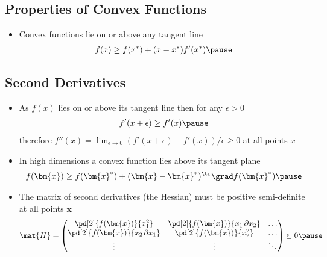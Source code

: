 
\begin{slide}
\section[-2]{Properties of Convex Functions}

\pb
\begin{itemize}
\item Convex functions lie on or above any tangent line
  \begin{align*}
    f(x) \geq f(x^*) + (x-x^*) f'(x^*)\pause
  \end{align*}
  \begin{center}
    \pauseb
  \end{center}
\end{itemize}

\end{slide}


\begin{slide}
\section[-2]{Second Derivatives}

\begin{PauseHighLight}
  \begin{itemize}
  \item As $f(x)$ lies on or above its tangent line then for any $\epsilon>0$
    \begin{align*}
      f'(x+\epsilon)\geq f'(x)\pause
    \end{align*}
    therefore $f''(x) = \lim_{\epsilon\rightarrow0} (f'(x+\epsilon)-
    f'(x))/\epsilon \geq 0$ at all points $x$\pause
  \item In high dimensions a convex function lies above its tangent plane
    \begin{align*}
      f(\bm{x}) \geq f(\bm{x}^*) + (\bm{x}-\bm{x}^*)^\tr \grad f(\bm{x}^*)\pause
    \end{align*}
  \item The matrix of second derivatives (the Hessian) must be
    positive semi-definite at all points $\bm{x}$
    {\small \begin{align*}
      \mat{H} =
      \begin{pmatrix}
        \pd[2]{f(\bm{x})}{x_1^2} & \pd[2]{f(\bm{x})}{x_1\, \partial
          x_2} & \ldots \\
        \pd[2]{f(\bm{x})}{x_2 \, \partial x_1} &
        \pd[2]{f(\bm{x})}{x_2^2} & \ldots\\
        \vdots & \vdots & \ddots
      \end{pmatrix} \succeq 0\pause
    \end{align*} }
  \end{itemize}
\end{PauseHighLight}

\end{slide}

